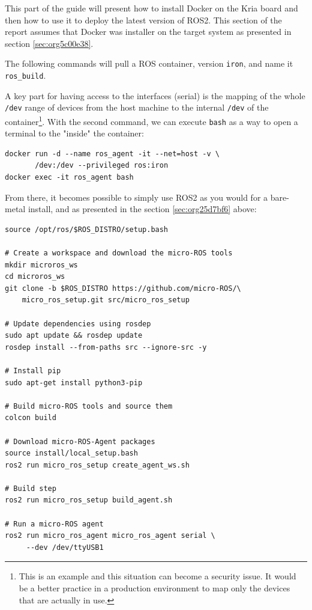 \documentclass[10pt]{article}
\begin{document}
This part of the guide will present how to install Docker on the
Kria board and then how to use it to deploy the latest version of ROS2.
This section of the report assumes that Docker was installer on the target system
as presented in section \ref{sec:org5c00e38}.

The following commands will pull a ROS container, version \texttt{iron}, and name it \texttt{ros\_build}.

A key part for having access to the interfaces (serial) is the mapping of the whole \texttt{/dev}
range of devices from the host machine to the internal \texttt{/dev} of the container\footnote{This is an example and this situation can become a security issue. It would be a better practice
in a production environment to map only the devices that are actually in use.}.
With the second command, we can execute \texttt{bash} as a way to open a terminal to the "inside" the container:
\begin{verbatim}
docker run -d --name ros_agent -it --net=host -v \
       /dev:/dev --privileged ros:iron
docker exec -it ros_agent bash
\end{verbatim}

From there, it becomes possible to simply use ROS2 as you would for a bare-metal install,
and as presented in the section \ref{sec:org25d7bf6} above:
\begin{verbatim}
source /opt/ros/$ROS_DISTRO/setup.bash

# Create a workspace and download the micro-ROS tools
mkdir microros_ws
cd microros_ws
git clone -b $ROS_DISTRO https://github.com/micro-ROS/\
    micro_ros_setup.git src/micro_ros_setup

# Update dependencies using rosdep
sudo apt update && rosdep update
rosdep install --from-paths src --ignore-src -y

# Install pip
sudo apt-get install python3-pip

# Build micro-ROS tools and source them
colcon build

# Download micro-ROS-Agent packages
source install/local_setup.bash
ros2 run micro_ros_setup create_agent_ws.sh

# Build step
ros2 run micro_ros_setup build_agent.sh

# Run a micro-ROS agent
ros2 run micro_ros_agent micro_ros_agent serial \
     --dev /dev/ttyUSB1
\end{verbatim}
\end{document}
